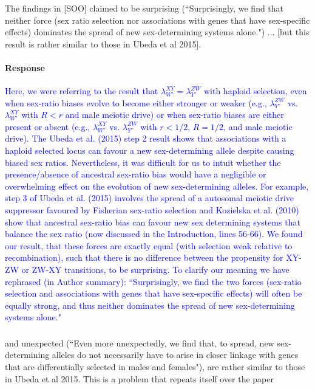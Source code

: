 \documentclass[10pt,letterpaper]{article}
\begin{document}
\noindent\subsubsection{}
The findings in [SOO] claimed to be surprising (``Surprisingly, we find that neither force (sex ratio selection nor associations with genes that have sex-specific effects) dominates the spread of new sex-determining systems alone.") ... [but this result is rather similar to those in Ubeda et al 2015]. 

\noindent\paragraph{Response}
\textcolor{blue}{Here, we were referring to the result that $\lambda_{W'}^{XY} = \lambda_{Y'}^{ZW}$ with haploid selection, even when sex-ratio biases evolve to become either stronger or weaker (e.g., $\lambda_{Y'}^{ZW}$ vs. $\lambda_{W'}^{XY}$ with $R<r$ and male meiotic drive) or when sex-ratio biases are either present or absent (e.g., $\lambda_{W'}^{XY}$ vs. $\lambda_{Y'}^{ZW}$ with $r<1/2$, $R=1/2$, and male meiotic drive). The Ubeda et al. (2015) step 2 result shows that associations with a haploid selected locus can favour a new sex-determining allele despite causing biased sex ratios. Nevertheless, it was difficult for us to intuit whether the presence/absence of ancestral sex-ratio bias would have a negligible or overwhelming effect on the evolution of new sex-determining alleles. For example, step 3 of Ubeda et al. (2015) involves the spread of a autosomal meiotic drive suppressor favoured by Fisherian sex-ratio selection and Kozielska et al. (2010) show that ancestral sex-ratio bias can favour new sex determining systems that balance the sex ratio (now discussed in the Introduction, lines 56-66). We found our result, that these forces are exactly equal (with selection weak relative to recombination), such that there is no difference between the propensity for XY-ZW or ZW-XY transitions, to be surprising.
To clarify our meaning we have rephrased (in Author summary): ``Surprisingly, we find the two forces (sex-ratio selection and associations with genes that have sex-specific effects) will often be equally strong, and thus neither dominates the spread of new sex-determining systems alone."}

\noindent\subsubsection{}
\noindent and unexpected (``Even more unexpectedly, we find that, to spread, new sex-determining alleles do not necessarily have to arise in closer linkage with genes that are differentially selected in males and females"), are rather similar to those in Ubeda et al 2015. This is a problem that repeats itself over the paper 
\end{document}
